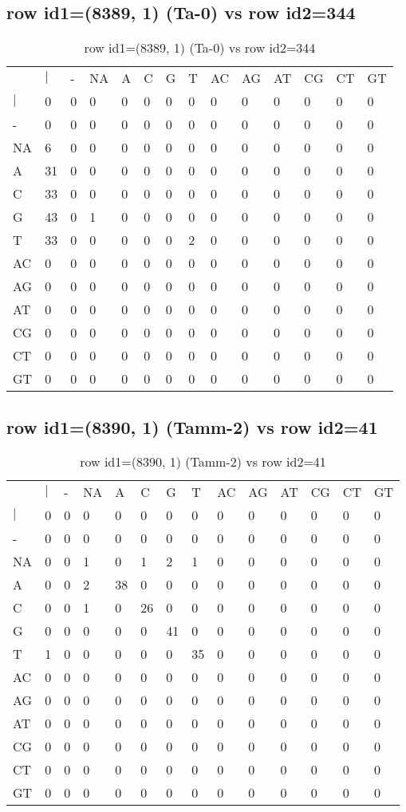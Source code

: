 \subsection{row id1=(8389, 1) (Ta-0) vs row id2=344}
\begin{center}
\begin{longtable}{|l|l|l|l|l|l|l|l|l|l|l|l|l|l|}
\caption{row id1=(8389, 1) (Ta-0) vs row id2=344} \label{table_dm438}\\
\hline
\\
\hline
&$|$&-&NA&A&C&G&T&AC&AG&AT&CG&CT&GT\\
$|$&0&0&0&0&0&0&0&0&0&0&0&0&0\\
-&0&0&0&0&0&0&0&0&0&0&0&0&0\\
NA&6&0&0&0&0&0&0&0&0&0&0&0&0\\
A&31&0&0&0&0&0&0&0&0&0&0&0&0\\
C&33&0&0&0&0&0&0&0&0&0&0&0&0\\
G&43&0&1&0&0&0&0&0&0&0&0&0&0\\
T&33&0&0&0&0&0&2&0&0&0&0&0&0\\
AC&0&0&0&0&0&0&0&0&0&0&0&0&0\\
AG&0&0&0&0&0&0&0&0&0&0&0&0&0\\
AT&0&0&0&0&0&0&0&0&0&0&0&0&0\\
CG&0&0&0&0&0&0&0&0&0&0&0&0&0\\
CT&0&0&0&0&0&0&0&0&0&0&0&0&0\\
GT&0&0&0&0&0&0&0&0&0&0&0&0&0\\
\hline
\end{longtable}
\end{center}

\subsection{row id1=(8390, 1) (Tamm-2) vs row id2=41}
\begin{center}
\begin{longtable}{|l|l|l|l|l|l|l|l|l|l|l|l|l|l|}
\caption{row id1=(8390, 1) (Tamm-2) vs row id2=41} \label{table_dm440}\\
\hline
\\
\hline
&$|$&-&NA&A&C&G&T&AC&AG&AT&CG&CT&GT\\
$|$&0&0&0&0&0&0&0&0&0&0&0&0&0\\
-&0&0&0&0&0&0&0&0&0&0&0&0&0\\
NA&0&0&1&0&1&2&1&0&0&0&0&0&0\\
A&0&0&2&38&0&0&0&0&0&0&0&0&0\\
C&0&0&1&0&26&0&0&0&0&0&0&0&0\\
G&0&0&0&0&0&41&0&0&0&0&0&0&0\\
T&1&0&0&0&0&0&35&0&0&0&0&0&0\\
AC&0&0&0&0&0&0&0&0&0&0&0&0&0\\
AG&0&0&0&0&0&0&0&0&0&0&0&0&0\\
AT&0&0&0&0&0&0&0&0&0&0&0&0&0\\
CG&0&0&0&0&0&0&0&0&0&0&0&0&0\\
CT&0&0&0&0&0&0&0&0&0&0&0&0&0\\
GT&0&0&0&0&0&0&0&0&0&0&0&0&0\\
\hline
\end{longtable}
\end{center}

